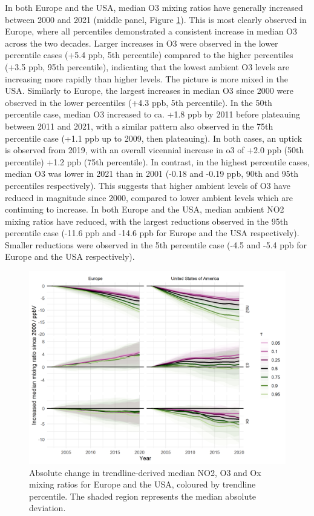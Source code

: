 \documentclass[journal abbreviation, manuscript]{copernicus}
\begin{document}
In both Europe and the USA, median O3 mixing ratios have generally increased between 2000 and 2021 (middle panel, Figure \ref{median_slopes_per_tau_cont_name_absolute}). This is most clearly observed in Europe, where all percentiles demonstrated a consistent increase in median O3 across the two decades. Larger increases in O3 were observed in the lower percentile cases (+5.4 ppb, 5th percentile) compared to the higher percentiles (+3.5 ppb, 95th percentile), indicating that the lowest ambient O3 levels are increasing more rapidly than higher levels.  The picture is more mixed in the USA. Similarly to Europe, the largest increases in median O3 since 2000 were observed in the lower percentiles (+4.3 ppb, 5th percentile). In the 50th percentile case, median O3 increased to ca. +1.8 ppb by 2011 before plateauing between 2011 and 2021, with a similar pattern also observed in the 75th percentile case (+1.1 ppb up to 2009, then plateauing). In both cases, an uptick is observed from 2019, with an overall vicennial increase in o3 of +2.0 ppb (50th percentile) +1.2 ppb (75th percentile). In contrast, in the highest percentile cases, median O3 was lower in 2021 than in 2001 (-0.18 and -0.19 ppb, 90th and 95th percentiles respectively). This suggests that higher ambient levels of O3 have reduced in magnitude since 2000, compared to lower ambient levels which are continuing to increase. In both Europe and the USA, median ambient NO2 mixing ratios have reduced, with the largest reductions observed in the 95th percentile case (-11.6 ppb and -14.6 ppb for Europe and the USA respectively). Smaller reductions were observed in the 5th percentile case (-4.5 and -5.4 ppb for Europe and the USA respectively).

\begin{figure}[h!]
\includegraphics[width=12cm]{plots/fixed_median_slopes_per_tau_continent_name_absolute_change_with_mad_ribbon.png}
\caption{Absolute change in trendline-derived median NO2, O3 and Ox mixing ratios for Europe and the USA, coloured by trendline percentile. The shaded region represents the median absolute deviation.}
\label{median_slopes_per_tau_cont_name_absolute}
\end{figure}
\end{document}
